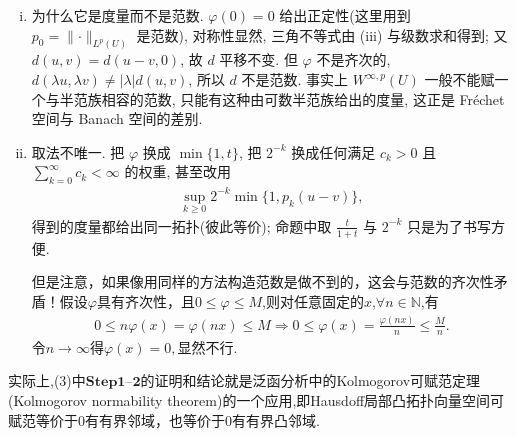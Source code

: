 \documentclass[../../main.tex]{subfiles}
\begin{document}
\begin{remark}
\begin{enumerate}[(i)]
\item 为什么它是度量而不是范数. $\varphi(0)=0$ 给出正定性(这里用到 $p_{0}=\lVert\cdot\rVert_{L^{p}(U)}$ 是范数), 对称性显然, 三角不等式由 (iii) 与级数求和得到; 又 $d(u,v)=d(u-v,0)$, 故 $d$ 平移不变. 但 $\varphi$ 不是齐次的, $d(\lambda u,\lambda v)\neq|\lambda|d(u,v)$, 所以 $d$ 不是范数. 事实上 $W^{\infty,p}(U)$ 一般不能赋一个与半范族相容的范数, 只能有这种由可数半范族给出的度量, 这正是 Fréchet 空间与 Banach 空间的差别.

\item 取法不唯一. 把 $\varphi$ 换成 $\min\{1,t\}$, 把 $2^{-k}$ 换成任何满足 $c_{k}>0$ 且 $\sum\limits_{k=0}^{\infty}c_{k}<\infty$ 的权重, 甚至改用
\begin{align*}
\sup\limits_{k\geqslant0}2^{-k}\min\bigl\{1,p_{k}(u-v)\bigr\},
\end{align*}
得到的度量都给出同一拓扑(彼此等价); 命题中取 $\frac{t}{1+t}$ 与 $2^{-k}$ 只是为了书写方便.

但是注意，如果像用同样的方法构造范数是做不到的，这会与范数的齐次性矛盾！假设$\varphi$具有齐次性，且$0\leqslant \varphi\leqslant M$,则对任意固定的$x$,$\forall n\in \mathbb{N}$,有
\begin{align*}
0\leqslant n\varphi \left( x \right) =\varphi \left( nx \right) \leqslant M\Longrightarrow 0\leqslant \varphi \left( x \right) =\frac{\varphi \left( nx \right)}{n}\leqslant \frac{M}{n}.
\end{align*}
令$n\to \infty$得$\varphi(x) =0,$显然不行.
\end{enumerate}
\end{remark}
\begin{remark}
实际上,(3)中$\mathbf{Step}\bm{1}$--$\bm{2}$的证明和结论就是泛函分析中的Kolmogorov可赋范定理(Kolmogorov normability theorem)的一个应用,即Hausdoff局部凸拓扑向量空间可赋范等价于$0$有有界邻域，也等价于$0$有有界凸邻域.
\end{remark}
\end{document}
